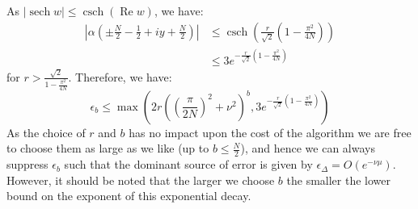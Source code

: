 \documentclass[aps,floatfix,10pt,amssymb,amsfont,amsmath,superscriptaddress,float,nofootinbib,longbibliography,nobalancelastpage,twocolumn]{revtex4-2}
\begin{document}
As $|\operatorname{sech} w| \leq \operatorname{csch}(\operatorname{Re} w)$, we have:
\begin{align}
    \left|\alpha(\pm\frac{N}{2}-\frac12+iy+\frac{N}{2})\right| &\leq \operatorname{csch}\left(\frac{r}{\sqrt{2}}\left(1-\frac{\pi^2}{4N}\right)\right)\\
    &\leq 3e^{-\frac{r}{\sqrt{2}}\left(1-\frac{\pi^2}{4N}\right)}
\end{align}
for $r > \frac{\sqrt{2}}{1-\frac{\pi^2}{4N}}$. Therefore, we have:
\begin{equation}
    \epsilon_b \leq \max\left(2r\left(
\left(\frac{\pi}{2N}\right)^2+\nu^2
\right)^{b},3e^{-\frac{r}{\sqrt{2}}\left(1-\frac{\pi^2}{4N}\right)}\right)
\end{equation}
As the choice of $r$ and $b$ has no impact upon the cost of the algorithm we are free to choose them as large as we like (up to $b\leq \frac{N}{2}$), and hence we can always suppress $\epsilon_b$ such that the dominant source of error is given by $\epsilon_{\Delta} = O(e^{-\nu\mu})$. However, it should be noted that the larger we choose $b$ the smaller the lower bound on the exponent of this exponential decay.
\end{document}
